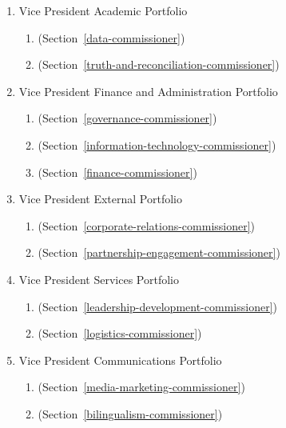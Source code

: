 \begin{enumerate}
  \begin{enumerate}
   \item
    Vice President Academic Portfolio
    \begin{enumerate}
     \item
       (Section~\ref{data-commissioner})
     \item
       (Section~\ref{truth-and-reconciliation-commissioner})
    \end{enumerate}
   \item
    Vice President Finance and Administration Portfolio
    \begin{enumerate}
     \item
       (Section~\ref{governance-commissioner})
     \item
       (Section~\ref{information-technology-commissioner})
     \item
       (Section~\ref{finance-commissioner})
    \end{enumerate}
   \item
    Vice President External Portfolio
    \begin{enumerate}
     \item
       (Section~\ref{corporate-relations-commissioner})
     \item
       (Section~\ref{partnership-engagement-commissioner})
    \end{enumerate}
   \item
    Vice President Services Portfolio
    \begin{enumerate}
     \item
       (Section~\ref{leadership-development-commissioner})
     \item
       (Section~\ref{logistics-commissioner})
    \end{enumerate}
   \item
    Vice President Communications Portfolio
    \begin{enumerate}
     \item
       (Section~\ref{media-marketing-commissioner})
     \item
       (Section~\ref{bilingualism-commissioner})
    \end{enumerate}
  \end{enumerate}


\end{enumerate}
